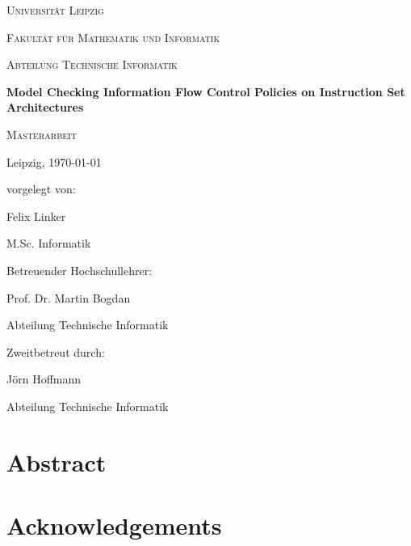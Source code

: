 \documentclass{securem}
\newenvironment{abstract}{%
    \begingroup
    \chapter*{\centering Abstract}
}{%
    \endgroup
}
\newenvironment{acknowledgements}{%
    \begingroup
    \chapter*{\centering Acknowledgements}
}{%
    \endgroup
}
\begin{document}
\begin{titlepage}
    \centering
    \par
    \vspace{1cm}
    {\scshape\LARGE Universität Leipzig} \par
    \vspace{0.3cm}
    {\scshape\Large Fakultät für Mathematik und Informatik} \par
    {\scshape\Large Abteilung Technische Informatik} \par
    \vspace{2.3cm}
    {\huge\bfseries Model Checking Information Flow Control Policies on Instruction Set Architectures} \par
    \vspace{1.5cm}
    {\scshape\Large Masterarbeit} \par
    \vspace{1.8cm}
    \begin{multicols}{2}
        Leipzig, \today \par
        \columnbreak
        vorgelegt von: \par
        Felix Linker \par
        M.Sc. Informatik
    \end{multicols}
    \vfill
    \begin{multicols}{2}
        Betreuender Hochschullehrer: \par
        Prof. Dr. Martin Bogdan \par
        Abteilung Technische Informatik \par
        \columnbreak
        Zweitbetreut durch: \par
        Jörn Hoffmann \par
        Abteilung Technische Informatik
    \end{multicols}
\end{titlepage}

\pagestyle{empty}
\begin{abstract}
    
\end{abstract}

\begin{acknowledgements}
    
\end{acknowledgements}

\tableofcontents

\printnoidxglossary[type=acronym]

\pagestyle{plain}
\setcounter{page}{1}
\end{document}
